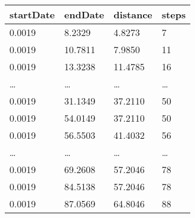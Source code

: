 \begin{tabular}{*{4}{l}}
startDate & endDate & distance & steps\\
\hline
0.0019 & 8.2329 & 4.8273 & 7\\
0.0019 & 10.7811 & 7.9850 & 11\\
0.0019 & 13.3238 & 11.4785 & 16\\
\dots & \dots & \dots & \dots\\
0.0019 & 31.1349 & 37.2110 & 50\\
0.0019 & 54.0149 & 37.2110 & 50\\
0.0019 & 56.5503 & 41.4032 & 56\\
\dots & \dots & \dots & \dots\\
0.0019 & 69.2608 & 57.2046 & 78\\
0.0019 & 84.5138 & 57.2046 & 78\\
0.0019 & 87.0569 & 64.8046 & 88
\end{tabular}
